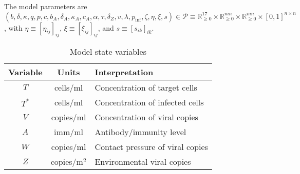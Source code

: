 \documentclass[11pt]{article}
\begin{document}
    The model parameters are $(b, \delta, \kappa, q, p, c, b_A, \delta_A,
    \kappa_A, c_A, \alpha, \tau, \delta_Z, v, \lambda, p_\text{inf}, \zeta,
    \eta, \xi, s) \in \mathcal{P} \equiv \mathbb{R}_{\geq 0}^{17} \times
    \mathbb{R}_{\geq 0}^{mn} \times \mathbb{R}_{\geq 0}^{mn} \times [0,
    1]^{n\times n}$, with $\eta \equiv [\eta_{ij}]_{ij}$, $\xi \equiv
    [\xi_{ij}]_{ij}$, and $s \equiv [s_{ik}]_{ik}$.


    \begin{table}[h!]
        \centering
        \caption{Model state variables}
        \vspace{1em}
        \begin{tabular}{ccl} \hline\hline
            Variable    & Units     & Interpretation \\\hline\hline
            $T$         & cells/ml  & Concentration of target cells \\
            $T^*$       & cells/ml  & Concentration of infected cells \\
            $V$         & copies/ml & Concentration of viral copies \\
            $A$         & imm/ml    & Antibody/immunity level \\
            $W$         & copies/ml
                                    & Contact pressure of viral copies \\
            $Z$         & copies/m$^2$
                                    & Environmental viral copies \\
            \hline
        \end{tabular}
        \label{tab:state}
    \end{table}
\end{document}
